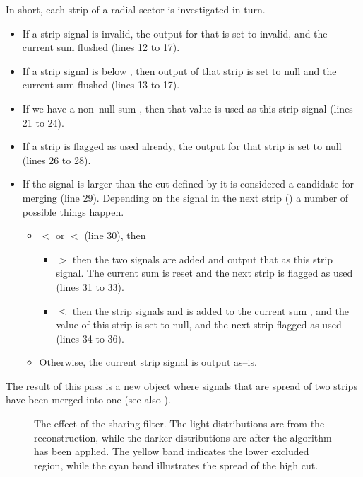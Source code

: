 In short, each strip  of a radial sector is investigated in
turn.  
\begin{itemize}
\item If a strip signal  is invalid, the output for that is
  set to invalid, and the current sum flushed (lines 12 to 17).
\item If a strip signal is below , then output of that
  strip is set to null and the current sum flushed (lines 13 to 17).
\item If we have a non--null sum , then that value is used
  as this strip signal (lines 21 to 24).  
\item If a strip is flagged as used already, the output for that strip
  is set to null (lines 26 to 28).
\item If the signal  is larger than the cut defined by
   it is considered a candidate for merging (line 29).
  Depending on the signal in the next strip () a number of
  possible things happen.
  \begin{itemize}
  \item {} $<$  or  $<$ 
    (line 30), then
    \begin{itemize}
    \item {} $>$  then the two signals are added
      and output that as this strip  signal.  The current
      sum  is reset and the next strip is flagged as used
      (lines 31 to 33).
    \item {} $\le$  then the strip signals
       and  is added to the current sum
      , and the value of this strip is set to null, and the
      next strip flagged as used (lines 34 to 36).
    \end{itemize}
  \item Otherwise, the current strip signal  is output
    as--is.
  \end{itemize}
\end{itemize}
The result of this pass is a new \ESD{} object where signals that are
spread of two strips have been merged into one (see also
).

\begin{figure}[htbp]
  \centering
  \caption{The effect of the sharing filter.  The light distributions
    are from the reconstruction, while the darker distributions are
    after the algorithm has been applied.  The yellow band indicates
    the lower excluded region, while the cyan band illustrates the
    spread of the high cut. }
  \label{fig:sharing:effect}
\end{figure}

